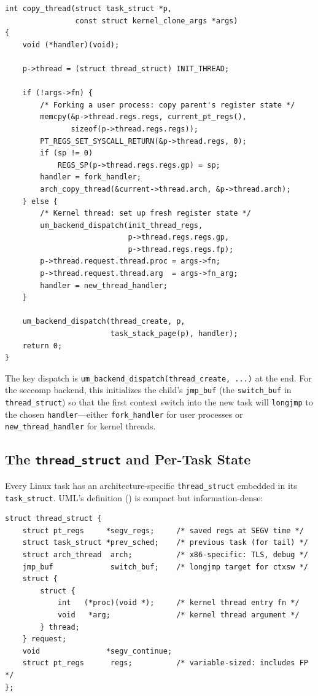 \begin{lstlisting}[language=KernelC,caption={Simplified \texttt{copy\_thread()} --- task creation dispatch},label=lst:copy-thread]
int copy_thread(struct task_struct *p,
                const struct kernel_clone_args *args)
{
    void (*handler)(void);

    p->thread = (struct thread_struct) INIT_THREAD;

    if (!args->fn) {
        /* Forking a user process: copy parent's register state */
        memcpy(&p->thread.regs.regs, current_pt_regs(),
               sizeof(p->thread.regs.regs));
        PT_REGS_SET_SYSCALL_RETURN(&p->thread.regs, 0);
        if (sp != 0)
            REGS_SP(p->thread.regs.regs.gp) = sp;
        handler = fork_handler;
        arch_copy_thread(&current->thread.arch, &p->thread.arch);
    } else {
        /* Kernel thread: set up fresh register state */
        um_backend_dispatch(init_thread_regs,
                            p->thread.regs.regs.gp,
                            p->thread.regs.regs.fp);
        p->thread.request.thread.proc = args->fn;
        p->thread.request.thread.arg  = args->fn_arg;
        handler = new_thread_handler;
    }

    um_backend_dispatch(thread_create, p,
                        task_stack_page(p), handler);
    return 0;
}
\end{lstlisting}

The key dispatch is \texttt{um\_backend\_dispatch(thread\_create, ...)} at the
end.  For the seccomp backend, this initializes the child's
\texttt{jmp\_buf} (the \texttt{switch\_buf} in \texttt{thread\_struct}) so
that the first context switch into the new task will \texttt{longjmp} to the
chosen \texttt{handler}---either \texttt{fork\_handler} for user processes or
\texttt{new\_thread\_handler} for kernel threads.

\subsection{The \texttt{thread\_struct} and Per-Task State}
\label{sec:impl-thread-struct}

Every Linux task has an architecture-specific \texttt{thread\_struct} embedded
in its \texttt{task\_struct}.  UML's definition
() is compact but
information-dense:

\begin{lstlisting}[language=KernelC,caption={UML's \texttt{thread\_struct}},label=lst:thread-struct]
struct thread_struct {
    struct pt_regs     *segv_regs;     /* saved regs at SEGV time */
    struct task_struct *prev_sched;    /* previous task (for tail) */
    struct arch_thread  arch;          /* x86-specific: TLS, debug */
    jmp_buf             switch_buf;    /* longjmp target for ctxsw */
    struct {
        struct {
            int   (*proc)(void *);     /* kernel thread entry fn */
            void   *arg;               /* kernel thread argument */
        } thread;
    } request;
    void               *segv_continue;
    struct pt_regs      regs;          /* variable-sized: includes FP */
};
\end{lstlisting}

